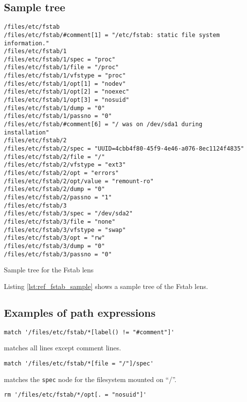 \subsection{Sample tree}

\begin{listing}
  \begin{verbatim}
/files/etc/fstab
/files/etc/fstab/#comment[1] = "/etc/fstab: static file system information."
/files/etc/fstab/1
/files/etc/fstab/1/spec = "proc"
/files/etc/fstab/1/file = "/proc"
/files/etc/fstab/1/vfstype = "proc"
/files/etc/fstab/1/opt[1] = "nodev"
/files/etc/fstab/1/opt[2] = "noexec"
/files/etc/fstab/1/opt[3] = "nosuid"
/files/etc/fstab/1/dump = "0"
/files/etc/fstab/1/passno = "0"
/files/etc/fstab/#comment[6] = "/ was on /dev/sda1 during installation"
/files/etc/fstab/2
/files/etc/fstab/2/spec = "UUID=4cbb4f80-45f9-4e46-a076-8ec1124f4835"
/files/etc/fstab/2/file = "/"
/files/etc/fstab/2/vfstype = "ext3"
/files/etc/fstab/2/opt = "errors"
/files/etc/fstab/2/opt/value = "remount-ro"
/files/etc/fstab/2/dump = "0"
/files/etc/fstab/2/passno = "1"
/files/etc/fstab/3
/files/etc/fstab/3/spec = "/dev/sda2"
/files/etc/fstab/3/file = "none"
/files/etc/fstab/3/vfstype = "swap"
/files/etc/fstab/3/opt = "rw"
/files/etc/fstab/3/dump = "0"
/files/etc/fstab/3/passno = "0"
  \end{verbatim}
  \caption{Sample tree for the Fstab lens}
  \label{lst:ref_fstab_sample}
\end{listing}

Listing \ref{lst:ref_fstab_sample} shows a sample tree of the Fstab lens.

\subsection{Examples of path expressions}

\begin{verbatim}
match '/files/etc/fstab/*[label() != "#comment"]'
\end{verbatim}

matches all lines except comment lines.

\begin{verbatim}
match '/files/etc/fstab/*[file = "/"]/spec'
\end{verbatim}

matches the \verb!spec! node for the filesystem mounted on ``/''.

\begin{verbatim}
rm '/files/etc/fstab/*/opt[. = "nosuid"]'
\end{verbatim}

